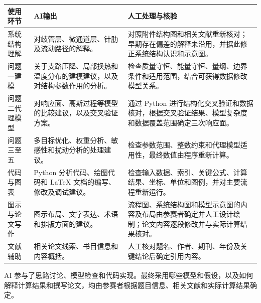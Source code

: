 \documentclass[UTF8,a4paper,11pt]{ctexart}
\begin{document}
\begin{table}[htbp]
\centering
\small
\begin{tabularx}{\textwidth}{L{2.05cm} L{4.15cm} Y}
\toprule
\textbf{使用环节} & \textbf{AI输出} & \textbf{人工处理与核验} \\
\midrule
系统结构理解 & 对歧管层、微通道层、针肋及流动路径的解释。 & 对照附件结构图和相关文献重新核对；早期存在偏差的解释未沿用，并据此修正系统结构认识和示意图。 \\
问题一建模 & 关于支路压降、局部换热和温度分布的建模建议，以及对结构参数作用的分析。 & 检查质量守恒、能量守恒、量纲、边界条件和适用范围，结合可获得数据修改模型关系。 \\
问题二代理模型 & 对响应面、高斯过程等模型的比较建议，以及交叉验证方案。 & 通过 Python 进行结构化交叉验证和数据核对，根据交叉验证结果、模型复杂度和数据覆盖范围确定三次响应面。 \\
问题三至五 & 多目标优化、权重分析、敏感性和扰动分析的处理建议。 & 检查参数范围、整数约束和代理模型适用性，最终数值由程序重新计算。 \\
代码与图表 & Python 分析代码、绘图代码和 \LaTeX{} 文档的编写、修改及调试建议。 & 检查输入数据、索引、关键公式、计算结果、坐标、单位和图例，并对主要流程重新运行。 \\
图示与论文写作 & 图示布局、文字表达、术语和排版方面的建议。 & 流程图、系统结构图和模型示意图的内容及布局由参赛者确定并人工设计绘制；论文内容逐段修改并与实际计算结果核对。 \\
文献辅助 & 相关论文线索、书目信息和内容概括。 & 人工核对题名、作者、期刊、年份及关键结论后确定引用内容。 \\
\bottomrule
\end{tabularx}
\end{table}

AI 参与了思路讨论、模型检查和代码实现。最终采用哪些模型和假设，以及如何解释计算结果和撰写论文，均由参赛者根据题目信息、相关文献和实际计算结果确定。
\end{document}

